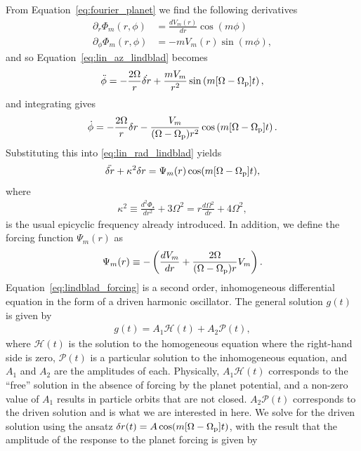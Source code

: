 From Equation~\eqref{eq:fourier_planet} we find the following derivatives
\begin{align}
    \partial_r \Phi_m (r, \phi) &= \frac{dV_m(r)}{dr} \cos (m \phi) \\
    \partial_\phi \Phi_m (r, \phi) &= - m V_m(r) \sin (m \phi),
\end{align}
and so Equation~\eqref{eq:lin_az_lindblad} becomes
\begin{align}
    \ddot{\phi} = - \frac{2 \Omega}{r} \dot{\delta r} + \frac{m V_m}{r^2} \sin \left( m [ \Omega - \Omega_{\rm p}] t\right),
\end{align}
and integrating gives
\begin{align}
    \dot{\phi} = - \frac{2 \Omega}{r} \delta r - \frac{V_m}{(\Omega - \Omega_{\rm p}) r^2} \cos \left( m [ \Omega - \Omega_{\rm p}] t \right).
\end{align}
Substituting this into \eqref{eq:lin_rad_lindblad} yields
\begin{align}
    \ddot{\delta r} + \kappa^2 \delta r = \Psi_m(r) \cos (m [ \Omega - \Omega_{\rm p}] t), \label{eq:lindblad_forcing}
\end{align}
where
\begin{align}
    \kappa^2 \equiv \frac{d^2 \Phi_\star}{dr^2} + 3 \Omega^2 = r \frac{d \Omega^2}{dr} + 4 \Omega^2,
\end{align}
is the usual epicyclic frequency already introduced. In addition, we define the forcing function $\Psi_m(r)$ as
\begin{align}
    \Psi_m(r) \equiv - \left( \frac{dV_m}{dr}+ \frac{2 \Omega}{(\Omega - \Omega_{\rm p})r} V_m \right).
\end{align}
Equation~\eqref{eq:lindblad_forcing} is a second order, inhomogeneous differential equation in the form of a driven harmonic oscillator.
The general solution $g(t)$ is given by 
\begin{align}
    g(t) = A_1 \mathcal{H}(t) + A_2 \mathcal{P}(t),
\end{align}
where $\mathcal{H}(t)$ is the solution to the homogeneous equation where the right-hand side is zero, $\mathcal{P}(t)$ is a particular solution to the inhomogeneous equation, and $A_1$ and $A_2$ are the amplitudes of each.
Physically, $A_1 \mathcal{H}(t)$ corresponds to the ``free'' solution in the absence of forcing by the planet potential, and a non-zero value of $A_1$ results in particle orbits that are not closed.
$A_2 \mathcal{P}(t)$ corresponds to the driven solution and is what we are interested in here.
We solve for the driven solution using the ansatz $\delta r (t) = A \cos (m [\Omega - \Omega_{\rm p}]t)$, with the result that the amplitude of the response to the planet forcing is given by 
